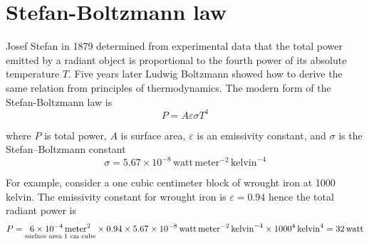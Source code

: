 

\section*{Stefan-Boltzmann law}

Josef Stefan in 1879 determined from experimental data that the total power
emitted by a radiant object is proportional
to the fourth power of its absolute temperature $T$.
Five years later Ludwig Boltzmann showed how to derive the same relation from principles of thermodynamics.
The modern form of the Stefan-Boltzmann law is
\begin{equation*}
P=A\varepsilon\sigma T^4
\end{equation*}

where $P$ is total power, $A$ is surface area, $\varepsilon$ is an emissivity constant,
and $\sigma$ is the Stefan--Boltzmann constant
\begin{equation*}
\sigma=5.67\times10^{-8}\,\text{watt}\,\text{meter}^{-2}\,\text{kelvin}^{-4}
\end{equation*}

For example, consider a one cubic centimeter block of wrought iron at 1000 kelvin.
The emissivity constant for wrought iron is $\varepsilon=0.94$
hence the total radiant power is
\begin{equation*}
P=\underset{\text{surface area 1 cm cube}}
{6\times10^{-4}\,\text{meter}^2}
\times
0.94
\times
5.67\times10^{-8}\,\text{watt}\,\text{meter}^{-2}\,\text{kelvin}^{-4}
\\
{}\times
1000^4\,\text{kelvin}^4
=32\,\text{watt}
\end{equation*}


